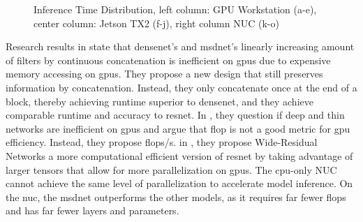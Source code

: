 \begin{figure}
\begin{minipage}{.33\textwidth}
		\hfill
		\hfill
	\end{minipage}
	\caption[Platform Inference Time of \gls{dnn}s]{Inference Time Distribution, left column: GPU Workstation (a-e), center column: Jetson TX2 (f-j), right column NUC (k-o)}
	\label{fig:inference-time-dist}
\end{figure}

Research results in \cite{lee_energy_2019} state that \gls{densenet}'s and \gls{msdnet}’s linearly increasing amount of filters by continuous concatenation is inefficient on \gls{gpu}s due to expensive memory accessing on \gls{gpu}s. They propose a new design that still preserves information by concatenation. Instead, they only concatenate once at the end of a block, thereby achieving runtime superior to \gls{densenet}, and they achieve comparable runtime and accuracy to \gls{resnet}. In \cite{lee_energy_2019}, they question if deep and thin networks are inefficient on \gls{gpu}s and argue that \gls{flop} is not a good metric for \gls{gpu} efficiency. Instead, they propose \gls{flop}s/s. in \cite{zagoruyko_wide_2017}, they propose Wide-Residual Networks a more computational efficient version of \gls{resnet} by taking advantage of larger tensors that allow for more parallelization on \gls{gpu}s. The \gls{cpu}-only NUC cannot achieve the same level of parallelization to accelerate model inference. On the \gls{nuc}, the \gls{msdnet} outperforms the other models, as it requires far fewer \gls{flop}s and has far fewer layers and parameters. 

